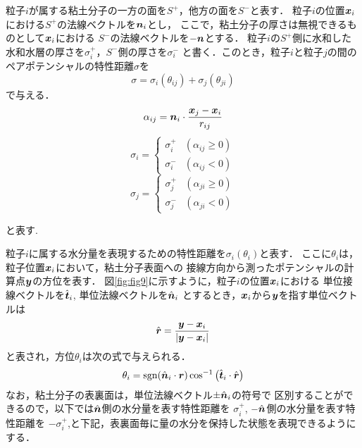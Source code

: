 粒子$i$が属する粘土分子の一方の面を$S^+$，他方の面を$S^-$と表す．
粒子$i$の位置$\mbox{\boldmath $x$}_i$における$S^+$の法線ベクトルを$\mbox{\boldmath $n$}_i$とし，
ここで，粘土分子の厚さは無視できるものとして$\mbox{\boldmath $x$}_i$における
$S^-$の法線ベクトルを$-\mbox{\boldmath $n$}$とする．
粒子$i$の$S^+$側に水和した水和水層の厚さを$\sigma_i^+$，$S^-$側の厚さを$\sigma_i^-$
と書く．このとき，粒子$i$と粒子$j$の間のペアポテンシャルの特性距離$\sigma$を
\begin{equation}
	\sigma=\sigma_i(\theta_{ij})+\sigma_j(\theta_{ji})
\end{equation}
で与える．
\begin{equation}
	\alpha_{ij}
	=	
	\mbox{\boldmath $n$}_i\cdot \frac{\mbox{\boldmath $x$}_j-\mbox{\boldmath $x$}_i}{r_{ij}}		
\end{equation}
\begin{equation}
	\sigma_i=\left\{
	\begin{array}{cc}
		\sigma_i^+ & (\alpha_{ij} \ge 0)\\
		\sigma_i^- & (\alpha_{ij} <0)
	\end{array}
	\right.
\end{equation}
\begin{equation}
	\sigma_j=\left\{
	\begin{array}{cc}
		\sigma_j^+ & (\alpha_{ji} \ge 0)\\
		\sigma_j^- & (\alpha_{ji} <0)
	\end{array}
	\right.
\end{equation}

と表す.

粒子$i$に属する水分量を表現するための特性距離を$\sigma_i(\theta_i)$と表す．
ここに$\theta_i$は，粒子位置$\mbox{\boldmath $x$}_i$において，粘土分子表面への
接線方向から測ったポテンシャルの計算点$\mbox{\boldmath $y$}$の方位を表す．
図\ref{fig:fig9}に示すように，粒子$i$の位置$\mbox{\boldmath $x$}_i$における
単位接線ベクトルを$\hat{\mbox{\boldmath $t$}}_i$, 単位法線ベクトルを$\hat{\mbox{\boldmath $n$}}_i$
とするとき，$\mbox{\boldmath $x$}_i$から$\mbox{\boldmath $y$}$を指す単位ベクトルは
\begin{equation}
	\hat{\mbox{\boldmath $r$}}=\frac{\mbox{\boldmath $y$}-\mbox{\boldmath $x$}_i}{\left| \mbox{\boldmath $y$}-\mbox{\boldmath $x$}_i\right|}
	\label{eqn:def_rhat}
\end{equation}
と表され，方位$\theta_i$は次の式で与えられる．
\begin{equation}
	\theta_i = {\rm sgn} (\hat{\mbox{\boldmath $n$}}_i \cdot \mbox{\boldmath $r$}) 
	\cos^{-1}\left( \hat{\mbox{\boldmath $t$}}_i\cdot \hat{\mbox{\boldmath $r$}}\right)
	\label{eqn:def_th}
\end{equation}
なお，粘土分子の表裏面は，単位法線ベクトル$\pm \hat{\mbox{\boldmath $n$}}_i$の符号で
区別することができるので，以下では$\hat{\mbox{\boldmath $n$}}$側の水分量を表す特性距離を
$\sigma^+_i$, $-\hat{\mbox{\boldmath $n$}}$側の水分量を表す特性距離を
$-\sigma^+_i$,と下記，表裏面毎に量の水分を保持した状態を表現できるようにする．

